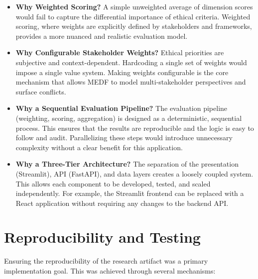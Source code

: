 \begin{itemize}[leftmargin=2em]
  \item \textbf{Why Weighted Scoring?} A simple unweighted average of dimension scores would fail to capture the differential importance of ethical criteria. Weighted scoring, where weights are explicitly defined by stakeholders and frameworks, provides a more nuanced and realistic evaluation model.

  \item \textbf{Why Configurable Stakeholder Weights?} Ethical priorities are subjective and context-dependent. Hardcoding a single set of weights would impose a single value system. Making weights configurable is the core mechanism that allows MEDF to model multi-stakeholder perspectives and surface conflicts.

  \item \textbf{Why a Sequential Evaluation Pipeline?} The evaluation pipeline (weighting, scoring, aggregation) is designed as a deterministic, sequential process. This ensures that the results are reproducible and the logic is easy to follow and audit. Parallelizing these steps would introduce unnecessary complexity without a clear benefit for this application.

  \item \textbf{Why a Three-Tier Architecture?} The separation of the presentation (Streamlit), API (FastAPI), and data layers creates a loosely coupled system. This allows each component to be developed, tested, and scaled independently. For example, the Streamlit frontend can be replaced with a React application without requiring any changes to the backend API.
\end{itemize}

\section{Reproducibility and Testing}
\label{sec:testing}

Ensuring the reproducibility of the research artifact was a primary implementation goal. This was achieved through several mechanisms:

